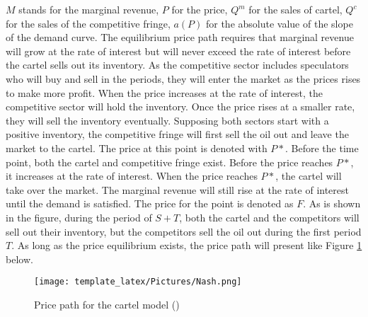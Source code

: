 $M$ stands for the marginal revenue, $P$ for the price, $Q^m$ for the sales of cartel, $Q^c$ for the sales of the competitive fringe, $a(P)$ for the absolute value of the slope of the demand curve. The equilibrium price path requires that marginal revenue will grow at the rate of interest but will never exceed the rate of interest before the cartel sells out its inventory. As the competitive sector includes speculators who will buy and sell in the periods, they will enter the market as the prices rises to make more profit. When the price increases at the rate of interest, the competitive sector will hold the inventory. Once the price rises at a smaller rate, they will sell the inventory eventually. Supposing both sectors start with a positive inventory, the competitive fringe will first sell the oil out and leave the market to the cartel. The price at this point is denoted with $P*$. Before the time point, both the cartel and competitive fringe exist. Before the price reaches $P*$, it increases at the rate of interest. When the price reaches $P*$, the cartel will take over the market. The marginal revenue will still rise at the rate of interest until the demand is satisfied. The price for the point is denoted as $F$. As is shown in the figure, during the period of $S+T$, both the cartel and the competitors will sell out their inventory, but the competitors sell the oil out during the first period $T$. As long as the price equilibrium exists, the price path will present like Figure \ref{nash1} below.
\begin{figure}[h]
\texttt{[image: template\_latex/Pictures/Nash.png]}
\centering
\caption{Price path for the cartel model (\cite{salant1976exhaustible})}
\label{nash1}
\end{figure}


